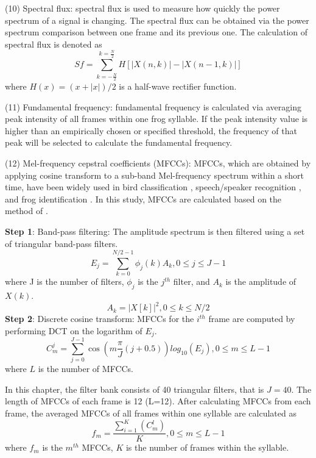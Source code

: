 \noindent(10) Spectral flux: spectral flux is used to measure how quickly the power spectrum of a signal is changing. The spectral flux can be obtained via the power spectrum comparison between one frame and its previous one. The calculation of spectral flux is denoted as
\begin{equation}
Sf = \sum_{k=-\frac{N}{2}}^{k=\frac{N}{2}}H[|X(n,k)|-|X(n-1,k)|]
\end{equation}
where $H(x)=(x+|x|)/2$ is a half-wave rectifier function.

\vspace{3mm}

\noindent(11) Fundamental frequency: fundamental frequency is calculated via averaging peak intensity of all frames within one frog syllable. If the peak intensity value is higher than an empirically chosen or specified threshold, the frequency of that peak will be selected to calculate the fundamental frequency.

\vspace{3mm}

\noindent(12) Mel-frequency cepstral coefficients (MFCCs): MFCCs, which are obtained by applying cosine transform to a sub-band Mel-frequency spectrum within a short time, have been widely used in bird classification \citep{lee2006automatic}, speech/speaker recognition \citep{han2006efficient}, and frog identification \citep{bedoya2014automatic}. In this study, MFCCs are calculated based on the method of \citep{lee2006automatic}. 

\noindent  \textbf{Step 1}: Band-pass filtering: The amplitude spectrum is then filtered using a set of triangular band-pass filters.
\begin{equation}
E_{j}=\sum_{k=0}^{N/2-1}\phi_{j}(k)A_{k}, 0 \leq j \leq J-1
\end{equation}
where J is the number of filters, $\phi_{j}$ is the $j^{th}$ filter, and $A_{k}$ is the amplitude of $X(k)$.
\begin{equation}
A_{k}=|X[k]|^{2}, 0 \leq k \leq N/2
\end{equation}
\noindent  \textbf{Step 2}: Discrete cosine transform: MFCCs for the $i^{th}$ frame are computed by performing DCT on the logarithm of $E_{j}$. 
\begin{equation}
C_{m}^{j} = \sum_{j=0}^{J-1}\cos(m \frac{\pi}{J}(j+0.5))log_{10}(E_{j}), 0 \leq m \leq L-1
\end{equation}
where $L$ is the number of MFCCs.

In this chapter, the filter bank consists of 40 triangular filters, that is  $J=40$. The length of MFCCs of each frame is 12 (L=12). After calculating MFCCs from each frame, the averaged MFCCs of all frames within one syllable are calculated as
\begin{equation}
f_{m}= \frac{\sum_{i=1}^{K}(C_{m}^{l})}{K}, 0\leq m \leq L-1
\end{equation}
where $f_{m}$ is the $m^{th}$ MFCCs, $K$ is the number of frames within the syllable. 

